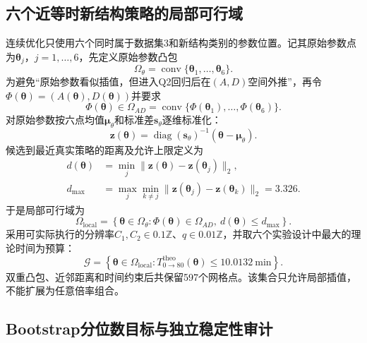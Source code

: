 \documentclass[withoutpreface]{cumcmthesis}
\begin{document}
\subsection{六个近等时新结构策略的局部可行域}

连续优化只使用六个同时属于数据集3和新结构类别的参数位置。记其原始参数点为$\boldsymbol\theta_j$，$j=1,\ldots,6$，先定义原始参数凸包
\begin{equation}
\Omega_{\theta}=\operatorname{conv}\{\boldsymbol\theta_1,\ldots,\boldsymbol\theta_6\}.
\end{equation}
为避免“原始参数看似插值，但进入Q2回归后在$(A,D)$空间外推”，再令$\Phi(\boldsymbol\theta)=(A(\boldsymbol\theta),D(\boldsymbol\theta))$并要求
\begin{equation}
\Phi(\boldsymbol\theta)\in
\Omega_{AD}=\operatorname{conv}\{\Phi(\boldsymbol\theta_1),\ldots,\Phi(\boldsymbol\theta_6)\}.
\end{equation}
对原始参数按六点均值$\boldsymbol\mu_\theta$和标准差$\boldsymbol s_\theta$逐维标准化：
\begin{equation}
\boldsymbol z(\boldsymbol\theta)
=\operatorname{diag}(\boldsymbol s_\theta)^{-1}
(\boldsymbol\theta-\boldsymbol\mu_\theta).
\end{equation}
候选到最近真实策略的距离及允许上限定义为
\begin{align}
d(\boldsymbol\theta)&=\min_j
\|\boldsymbol z(\boldsymbol\theta)-\boldsymbol z(\boldsymbol\theta_j)\|_2,\\
d_{\max}&=\max_j\min_{k\ne j}
\|\boldsymbol z(\boldsymbol\theta_j)-\boldsymbol z(\boldsymbol\theta_k)\|_2=3.326.
\end{align}
于是局部可行域为
\begin{equation}
\boxed{\Omega_{\mathrm{local}}=\left\{
\boldsymbol\theta\in\Omega_{\theta}:
\Phi(\boldsymbol\theta)\in\Omega_{AD},\ d(\boldsymbol\theta)\le d_{\max}
\right\}}.
\end{equation}
采用可实际执行的分辨率$C_1,C_2\in0.1\mathbb Z$、$q\in0.01\mathbb Z$，并取六个实验设计中最大的理论时间为预算：
\begin{equation}
\mathcal G=\left\{\boldsymbol\theta\in\Omega_{\mathrm{local}}:
T_{0\rightarrow80}^{\mathrm{theo}}(\boldsymbol\theta)\le10.0132\ \mathrm{min}
\right\}.
\end{equation}
双重凸包、近邻距离和时间约束后共保留597个网格点。该集合只允许局部插值，不能扩展为任意倍率组合。

\subsection{Bootstrap分位数目标与独立稳定性审计}
\end{document}
